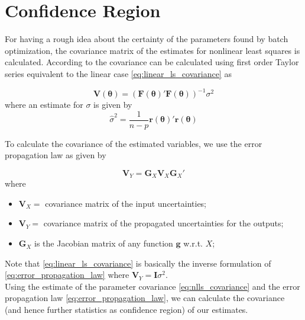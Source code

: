 \section{Confidence Region}
\label{sec:confidence_region}
For having a rough idea about the certainty of the parameters found by batch optimization, the covariance matrix of the estimates for nonlinear least squares is calculated.
According to \citet[chap. 2]{Seber} the covariance can be calculated using first order Taylor series equivalent to the linear case \cref{eq:linear_ls_covariance} as

\begin{equation}
\label{eq:nlls_covariance}
\mathbf{V}(\boldsymbol{\theta}) = (\mathbf{F}(\boldsymbol{\theta})'\mathbf{F}(\boldsymbol{\theta})) ^{-1} \sigma^2
\end{equation}
where an estimate for $\sigma$ is given by
\begin{equation*}
\hat{\sigma}^2 = \frac{1}{n-p} \mathbf{r}(\boldsymbol{\theta})' \mathbf{r}(\boldsymbol{\theta})
\end{equation*}

To calculate the covariance of the estimated variables, we use the error propagation law as given by \citet[eq. 4.15]{Siegwart}

\begin{equation}
\label{eq:error_propagation_law}
\mathbf{V}_Y = \mathbf{G}_X \mathbf{V}_X \mathbf{G}_X'
\end{equation}
where
\begin{itemize}
\item[] $\mathbf{V}_X =$ covariance matrix of the input uncertainties;
\item[] $\mathbf{V}_Y =$ covariance matrix of the propagated uncertainties for the outputs;
\item[] $\mathbf{G}_X  $ is the Jacobian matrix of any function $\mathbf{g}$ w.r.t. $X$;
\end{itemize}

Note that \cref{eq:linear_ls_covariance} is basically the inverse formulation of \cref{eq:error_propagation_law} where $\mathbf{V}_Y = \mathbf{I} \sigma^2$.
\\

Using the estimate of the parameter covariance \cref{eq:nlls_covariance} and the error propagation law \cref{eq:error_propagation_law}, we can calculate the covariance (and hence further statistics as confidence region) of our estimates.
\\

